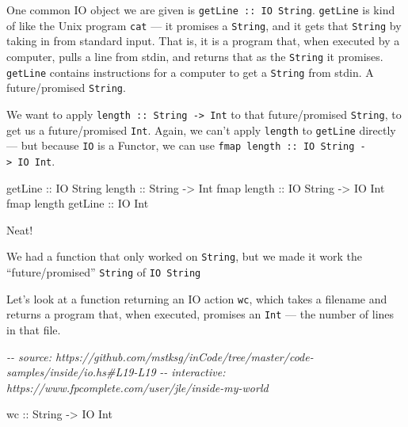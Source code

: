 \documentclass[]{article}
\newenvironment{Shaded}{}{}
\newcommand{\CommentTok}[1]{\textcolor[rgb]{0.38,0.63,0.69}{\textit{#1}}}
\newcommand{\DataTypeTok}[1]{\textcolor[rgb]{0.56,0.13,0.00}{#1}}
\newcommand{\FunctionTok}[1]{\textcolor[rgb]{0.02,0.16,0.49}{#1}}
\newcommand{\OtherTok}[1]{\textcolor[rgb]{0.00,0.44,0.13}{#1}}
\begin{document}
One common IO object we are given is \texttt{getLine\ ::\ IO\ String}.
\texttt{getLine} is kind of like the Unix program \texttt{cat} --- it promises a
\texttt{String}, and it gets that \texttt{String} by taking in from standard
input. That is, it is a program that, when executed by a computer, pulls a line
from stdin, and returns that as the \texttt{String} it promises.
\texttt{getLine} contains instructions for a computer to get a \texttt{String}
from stdin. A future/promised \texttt{String}.

We want to apply \texttt{length\ ::\ String\ -\textgreater{}\ Int} to that
future/promised \texttt{String}, to get us a future/promised \texttt{Int}.
Again, we can't apply \texttt{length} to \texttt{getLine} directly --- but
because \texttt{IO} is a Functor, we can use
\texttt{fmap\ length\ ::\ IO\ String\ -\textgreater{}\ IO\ Int}.

\begin{Shaded}
\begin{Highlighting}[]
\FunctionTok{getLine}\OtherTok{             ::} \DataTypeTok{IO} \DataTypeTok{String}
\FunctionTok{length}\OtherTok{              ::} \DataTypeTok{String} \OtherTok{{-}\textgreater{}} \DataTypeTok{Int}
\FunctionTok{fmap}\OtherTok{ length         ::} \DataTypeTok{IO} \DataTypeTok{String} \OtherTok{{-}\textgreater{}} \DataTypeTok{IO} \DataTypeTok{Int}
\FunctionTok{fmap} \FunctionTok{length}\OtherTok{ getLine ::} \DataTypeTok{IO} \DataTypeTok{Int}
\end{Highlighting}
\end{Shaded}

Neat!

We had a function that only worked on \texttt{String}, but we made it work the
``future/promised'' \texttt{String} of \texttt{IO\ String}

Let's look at a function returning an IO action \texttt{wc}, which takes a
filename and returns a program that, when executed, promises an \texttt{Int} ---
the number of lines in that file.

\begin{Shaded}
\begin{Highlighting}[]
\CommentTok{{-}{-} source: https://github.com/mstksg/inCode/tree/master/code{-}samples/inside/io.hs\#L19{-}L19}
\CommentTok{{-}{-} interactive: https://www.fpcomplete.com/user/jle/inside{-}my{-}world}

\OtherTok{wc ::} \DataTypeTok{String} \OtherTok{{-}\textgreater{}} \DataTypeTok{IO} \DataTypeTok{Int}
\end{Highlighting}
\end{Shaded}
\end{document}
